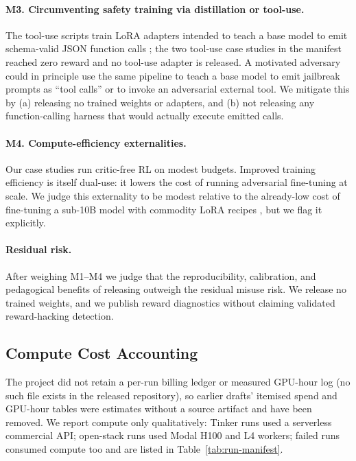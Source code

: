 \paragraph{M3. Circumventing safety training via distillation or tool-use.}
The tool-use scripts train LoRA adapters intended to teach a base model to emit
schema-valid JSON function calls \cite{liu2024xlam}; the two tool-use case
studies in the manifest reached zero reward and no tool-use adapter is released. A motivated adversary
could in principle use the same pipeline to teach a base model to emit
jailbreak prompts as ``tool calls'' or to invoke an adversarial external
tool. We mitigate this by (a) releasing no trained weights or adapters,
and (b) not releasing any function-calling harness that would actually
execute emitted calls.

\paragraph{M4. Compute-efficiency externalities.}
Our case studies run critic-free RL on modest budgets. Improved training efficiency is
itself dual-use: it lowers the cost of running adversarial fine-tuning at
scale. We judge this externality to be modest relative to the already-low
cost of fine-tuning a sub-10B model with commodity LoRA recipes
\cite{hu2022lora}, but we flag it explicitly.

\paragraph{Residual risk.}
After weighing M1--M4 we judge that the reproducibility, calibration, and
pedagogical benefits of releasing \ours{} outweigh the residual misuse
risk. We release no trained weights, and we publish reward diagnostics without
claiming validated reward-hacking detection.

\subsection{Compute Cost Accounting}
\label{sec:compute_accounting}

The project did not retain a per-run billing ledger or measured
GPU-hour log (no such file exists in the released repository), so earlier
drafts' itemised spend and GPU-hour tables were estimates without a source
artifact and have been removed. We report compute only qualitatively:
Tinker runs used a serverless commercial API; open-stack runs used Modal
H100 and L4 workers; failed runs consumed compute too and are listed in
Table~\ref{tab:run-manifest}.

